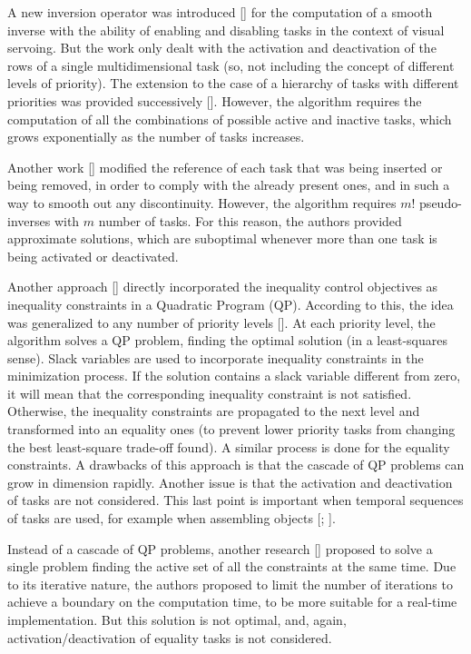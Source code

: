 A new inversion operator was introduced [\cite{IntroTpik22}] for the computation of a smooth inverse with the ability of enabling and disabling tasks in the context of visual servoing. But the work only dealt with the activation and deactivation of the rows of a single multidimensional task (so, not including the concept of different levels of priority). The extension to the case of a hierarchy of tasks with different priorities was provided successively [\cite{IntroTpik23}]. However, the algorithm requires the computation of all the combinations of possible active and inactive tasks, which grows exponentially as the number of tasks increases.

Another work [\cite{IntroTpik21}] modified the reference of each task that was being inserted or being removed, in order to comply with the already present ones, and in such a way to smooth out any discontinuity. However, the algorithm requires $m!$ pseudo-inverses with $m$ number of tasks. For this reason, the authors provided approximate solutions, which are suboptimal whenever more than one task is being activated or deactivated.

Another approach [\cite{IntroTpik25}] directly incorporated the inequality control objectives as inequality constraints in a Quadratic Program (QP). According to this, the idea was generalized to any number of priority levels [\cite{IntroTpik26}]. At each priority level, the algorithm solves a QP problem, finding the optimal solution (in a least-squares sense). Slack variables are used to incorporate inequality constraints in the minimization process. If the solution contains a slack variable different from zero, it will mean that the corresponding inequality constraint is not satisfied. Otherwise, the inequality constraints are propagated to the next level and transformed into an equality ones (to prevent lower priority tasks from changing the best least-square trade-off found). A similar process is done for the equality constraints. A drawbacks of this approach is that the cascade of QP problems can grow  in dimension rapidly. Another issue is that the activation and deactivation of tasks are not considered. This last point is important when temporal sequences of tasks are used, for example when  assembling objects [\cite{IntroTpik28}; \cite{IntroTpik27}].

Instead of a cascade of QP problems, another research [\cite{IntroTpik29}] proposed to solve a single problem finding the active set of all the constraints at the same time. Due to its iterative nature, the authors proposed to limit the number of iterations to achieve a boundary on the computation time, to be more suitable for a real-time implementation. But this solution is not optimal, and, again, activation/deactivation of equality tasks is not considered.

